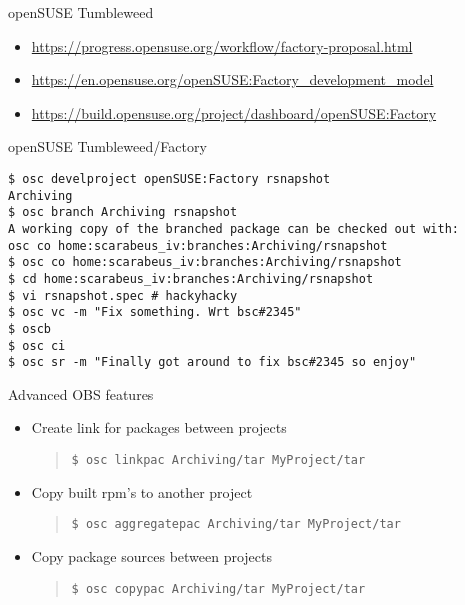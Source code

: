 \documentclass{beamer}
\begin{document}
\begin{frame}{openSUSE Tumbleweed}
	\begin{itemize}
	\item{\url{https://progress.opensuse.org/workflow/factory-proposal.html}}
	\item{\url{https://en.opensuse.org/openSUSE:Factory\_development\_model}}
	\item{\url{https://build.opensuse.org/project/dashboard/openSUSE:Factory}}
	\end{itemize}
\end{frame}

\begin{frame}[fragile]{openSUSE Tumbleweed/Factory}
	\begin{small}
\begin{verbatim}
$ osc develproject openSUSE:Factory rsnapshot
Archiving
$ osc branch Archiving rsnapshot
A working copy of the branched package can be checked out with:
osc co home:scarabeus_iv:branches:Archiving/rsnapshot
$ osc co home:scarabeus_iv:branches:Archiving/rsnapshot
$ cd home:scarabeus_iv:branches:Archiving/rsnapshot
$ vi rsnapshot.spec # hackyhacky
$ osc vc -m "Fix something. Wrt bsc#2345"
$ oscb
$ osc ci
$ osc sr -m "Finally got around to fix bsc#2345 so enjoy"
\end{verbatim}
	\end{small}
\end{frame}


\begin{frame}[fragile]{Advanced OBS features}
  \begin{itemize}
    \item Create link for packages between projects 
      \begin{quote}
\begin{verbatim}$ osc linkpac Archiving/tar MyProject/tar\end{verbatim}
      \end{quote}
    \item Copy built rpm's to another project
      \begin{quote}
\begin{verbatim}$ osc aggregatepac Archiving/tar MyProject/tar\end{verbatim}
      \end{quote}
    \item Copy package sources between projects
      \begin{quote}
\begin{verbatim}$ osc copypac Archiving/tar MyProject/tar\end{verbatim}
      \end{quote}
  \end{itemize}
\end{frame}
\end{document}
